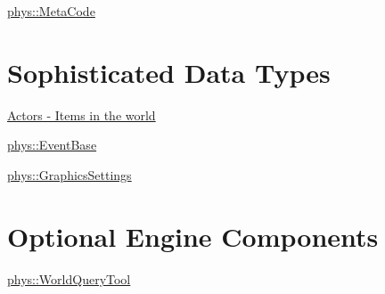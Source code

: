 \hyperlink{classphys_1_1MetaCode}{phys::MetaCode}\hypertarget{index_Classes}{}\section{Sophisticated Data Types}\label{index_Classes}
\hyperlink{classphys_1_1ActorBase}{Actors -\/ Items in the world}

\hyperlink{classphys_1_1EventBase}{phys::EventBase}

\hyperlink{classphys_1_1GraphicsSettings}{phys::GraphicsSettings}\hypertarget{index_Optional}{}\section{Optional Engine Components}\label{index_Optional}
\hyperlink{classphys_1_1WorldQueryTool}{phys::WorldQueryTool} 